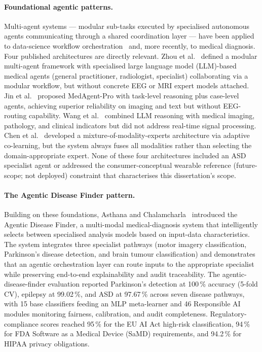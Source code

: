 \paragraph{Foundational agentic patterns.}
Multi-agent systems --- modular sub-tasks executed by specialised autonomous agents communicating through a shared coordination layer --- have been applied to data-science workflow orchestration~\cite{wang2024agentai} and, more recently, to medical diagnosis. Four published architectures are directly relevant. Zhou et al.~\cite{zhou2025mam} defined a modular multi-agent framework with specialised large language model (LLM)-based medical agents (general practitioner, radiologist, specialist) collaborating via a modular workflow, but without concrete EEG or MRI expert models attached. Jin et al.~\cite{jin2025medagent} proposed MedAgent-Pro with task-level reasoning plus case-level agents, achieving superior reliability on imaging and text but without EEG-routing capability. Wang et al.~\cite{wang2025llmagent} combined LLM reasoning with medical imaging, pathology, and clinical indicators but did not address real-time signal processing. Chen et al.~\cite{chen2025adacomed} developed a mixture-of-modality-experts architecture via adaptive co-learning, but the system always fuses all modalities rather than selecting the domain-appropriate expert. None of these four architectures included an ASD specialist agent or addressed the consumer-conceptual wearable reference (future-scope; not deployed) constraint that characterises this dissertation's scope.

\paragraph{The Agentic Disease Finder pattern.}
Building on these foundations, Asthana and Chalamcharla~\cite{asthana2025adf} introduced the Agentic Disease Finder, a multi-modal medical-diagnosis system that intelligently selects between specialised analysis models based on input-data characteristics. The system integrates three specialist pathways (motor imagery classification, Parkinson's disease detection, and brain tumour classification) and demonstrates that an agentic orchestration layer can route inputs to the appropriate specialist while preserving end-to-end explainability and audit traceability. The agentic-disease-finder evaluation reported Parkinson's detection at 100\,\% accuracy (5-fold CV), epilepsy at 99.02\,\%, and ASD at 97.67\,\% across seven disease pathways, with 15 base classifiers feeding an MLP meta-learner and 46 Responsible AI modules monitoring fairness, calibration, and audit completeness. Regulatory-compliance scores reached 95\,\% for the EU AI Act high-risk classification, 94\,\% for FDA Software as a Medical Device (SaMD) requirements, and 94.2\,\% for HIPAA privacy obligations.

